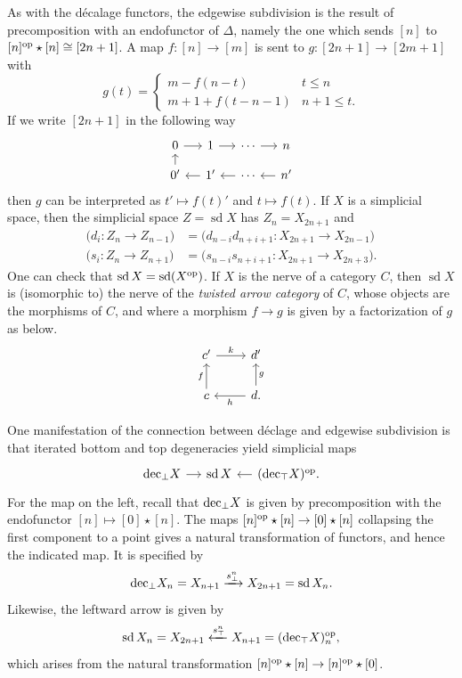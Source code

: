 \documentclass{conm-p-l}
\theoremstyle{definition}
\theoremstyle{remark}
\newcommand{\op}{\textup{op}}
\newcommand{\udec}{\textup{dec}_{\top}}
\newcommand{\ldec}{\textup{dec}_{\perp}}
\DeclareMathOperator{\sd}{sd}
\begin{document}
As with the d\'ecalage functors, the edgewise subdivision is the result of precomposition with an endofunctor of $\Delta$, namely the one which sends $[n]$ to $[n]^\op \star [n] \cong [2n+1]$.
A map $f \colon [n] \to [m]$ is sent to $g \colon [2n+1] \to [2m+1]$ with
\[
g(t) = \begin{cases}
m - f(n-t) & t \leq n \\
m+1 + f(t-n-1) & n+1 \leq t.
\end{cases}
\]
If we write $[2n+1]$ in the following way
\[
\begin{tikzcd}[sep=small]
  0 \rar & 1 \rar & \cdots \rar & n \\
  0' \uar & 1' \lar & \cdots \lar & n' \lar
\end{tikzcd}
\]
then $g$ can be interpreted as $t' \mapsto f(t)'$ and $t \mapsto f(t)$.
If $X$ is a simplicial space, then the simplicial space $Z = \sd X$ has $Z_n = X_{2n+1}$ and
\begin{align*}
  \big(d_i \colon Z_n \to Z_{n-1}\big) &= \big(d_{n-i} d_{n+i+1} \colon X_{2n+1} \to X_{2n-1}\big) \\
  \big(s_i \colon Z_n \to Z_{n+1}\big) &= \big(s_{n-i} s_{n+i+1} \colon X_{2n+1} \to X_{2n+3}\big).
\end{align*}
One can check that $\sd X = \sd (X^\op)$. %
If $X$ is the nerve of a category $C$, then $\sd X$ is (isomorphic to) the nerve of the \emph{twisted arrow category} of $C$, whose objects are the morphisms of $C$, and where a morphism $f \to g$ is given by a factorization of $g$ as below.
\[
\begin{tikzcd}  
  c' \rar{k} & d' \\
  c \uar{f} & d \lar{h} \uar[swap]{g}.
\end{tikzcd}
\]

One manifestation of the connection between d\'eclage and edgewise subdivision is that iterated bottom and top degeneracies yield simplicial maps
\[ \begin{tikzcd}[sep=small]
\ldec X \rar & \sd X & (\udec X)^\op. \lar
\end{tikzcd} \]
For the map on the left, recall that $\ldec X$ is given by precomposition with the endofunctor $[n] \mapsto [0] \star [n]$. 
The maps $[n]^\op \star [n] \to [0] \star [n]$ collapsing the first component to a point gives a natural transformation of functors, and hence the indicated map.
It is specified by
\begin{equation}\label{eq ldec to sd}
  \ldec X_n = X_{n+1} \xrightarrow{s_\bot^n} X_{2n+1} = \sd X_n.
\end{equation}
Likewise, the leftward arrow is given by
\[
  \sd X_n = X_{2n+1} \xleftarrow{s_\top^n} X_{n+1} = (\udec X)^\op_n,
\]
which arises from the natural transformation $[n]^\op \star [n] \to [n]^\op \star [0]$.
\end{document}
